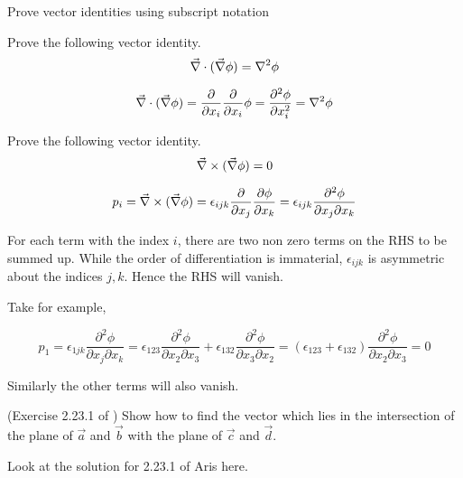 \begin{lo3}
Prove vector identities using subscript notation
\end{lo3}

\begin{question}
Prove the following vector identity.
\begin{equation}
\vec{\nabla} \cdot(\vec{\nabla} \phi) = \nabla^2\phi
\end{equation} 
\end{question}
\begin{solution}[print]
$$ \vec{\nabla} \cdot(\vec{\nabla} \phi) = \frac{\partial}{\partial x_i} \frac{\partial}{\partial x_i} \phi 
= \frac{\partial^2 \phi}{\partial x^2_i} = \nabla^2\phi $$
\end{solution}


\begin{question}
Prove the following vector identity.
\begin{equation}
\vec{\nabla} \times(\vec{\nabla} \phi) = 0
\end{equation} 
\end{question}
\begin{solution}[print]

$$ p_i = \vec{\nabla} \times(\vec{\nabla} \phi) = \epsilon_{ijk} \frac{\partial}{\partial x_j} \frac{\partial \phi}{\partial x_k} = \epsilon_{ijk} \frac{\partial^2 \phi}{\partial x_j \partial x_k} $$

For each term with the index $i$, there are two non zero terms on the RHS to be summed up. While the order of differentiation is immaterial, $\epsilon_{ijk}$ is asymmetric about the indices $j,k$. Hence the RHS will vanish.

Take for example,

$$ p_1 = \epsilon_{1jk} \frac{\partial^2 \phi}{\partial x_j \partial x_k} =
\epsilon_{123} \frac{\partial^2 \phi}{\partial x_2 \partial x_3} +  \epsilon_{132} \frac{\partial^2 \phi}{\partial x_3 \partial x_2}  = 
( \epsilon_{123} + \epsilon_{132}) \frac{\partial^2 \phi}{\partial x_2 \partial x_3} = 0 $$

Similarly the other terms will also vanish.
\end{solution}


\begin{question}[ID=qprereq1] \label{qp:aris2.23.1}
(Exercise 2.23.1 of \cite{aris}) Show how to find the vector which lies in the intersection of the plane of $\vec{a}$ and $\vec{b}$ with the plane of $\vec{c}$ and $\vec{d}$.
\end{question}
\begin{solution}[print]
Look at the solution for 2.23.1 of Aris here.
\end{solution}

